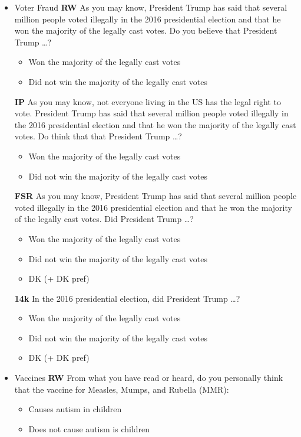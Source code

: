 \begin{itemize}
\item Voter Fraud\newline
\textbf{RW}\newline
As you may know, President Trump has said that several million people voted
illegally in the 2016 presidential election and that he won the majority of the legally
cast votes. Do you believe that President Trump \ldots?
\begin{itemize}
	\item Won the majority of the legally cast votes
	\item Did not win the majority of the legally cast votes
\end{itemize}

\textbf{IP}\newline
As you may know, not everyone living in the US has the legal right to vote. President
Trump has said that several million people voted illegally in the 2016 presidential
election and that he won the majority of the legally cast votes. Do think that that
President Trump \ldots?
\begin{itemize}
	\item Won the majority of the legally cast votes
	\item Did not win the majority of the legally cast votes
\end{itemize}

\textbf{FSR}\newline
As you may know, President Trump has said that several million people voted
illegally in the 2016 presidential election and that he won the majority of the legally
cast votes. Did President Trump \ldots?
\begin{itemize}
	\item Won the majority of the legally cast votes
	\item Did not win the majority of the legally cast votes
	\item DK (+ DK pref)
\end{itemize}

\textbf{14k}\newline
In the 2016 presidential election, did President Trump \ldots?
\begin{itemize}
	\item Won the majority of the legally cast votes
	\item Did not win the majority of the legally cast votes
	\item DK (+ DK pref)
\end{itemize}

\item Vaccines\newline
\textbf{RW}\newline
From what you have read or heard, do you personally think that the vaccine for
Measles, Mumps, and Rubella (MMR):
\begin{itemize}
	\item Causes autism in children
	\item Does not cause autism is children
\end{itemize}


\end{itemize}
